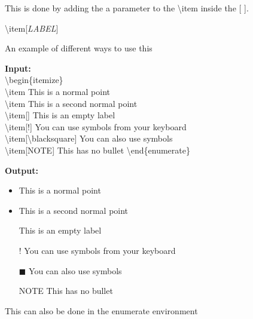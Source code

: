 \documentclass{article}
\newcommand{\jbs}[1]{\textbackslash{}#1} %
\begin{document}
This is done by adding the a parameter to the \jbs{item} inside the [ ].

\begin{center}
    \jbs{item}[\textit{LABEL}]
\end{center}

An example of different ways to use this \\

\begin{multicols}{2}
    \begin{minipage}{\linewidth}
        \textbf{Input:} \\
        \jbs{begin\{itemize\}} \\
        \jbs{item} This is a normal point \\
        \jbs{item} This is a second normal point \\
        \jbs{item}[] This is an empty label \\
        \jbs{item}[!] You can use symbols from your keyboard \\
        \jbs{item}[\jbs{blacksquare}] You can also use symbols \\
        \jbs{item}[NOTE] This has no bullet
        \jbs{end\{enumerate\}}
    \end{minipage}

    \begin{minipage}{\linewidth}
        \textbf{Output:} \\
        \begin{itemize}
            \item This is a normal point 
            \item This is a second normal point 
            \item [] This is an empty label 
            \item [!] You can use symbols from your keyboard
            \item [$\blacksquare$] You can also use symbols
            \item [NOTE] This has no bullet
        \end{itemize}
    \end{minipage}
\end{multicols}

This can also be done in the enumerate environment
\end{document}
